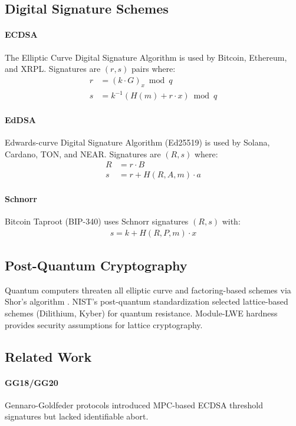 \documentclass[11pt,twocolumn]{article}
\begin{document}
\subsection{Digital Signature Schemes}

\paragraph{ECDSA} The Elliptic Curve Digital Signature Algorithm is used by Bitcoin, Ethereum, and XRPL. Signatures are $(r,s)$ pairs where:
\begin{align*}
r &= (k \cdot G)_x \bmod q \\
s &= k^{-1}(H(m) + r \cdot x) \bmod q
\end{align*}

\paragraph{EdDSA} Edwards-curve Digital Signature Algorithm (Ed25519) is used by Solana, Cardano, TON, and NEAR. Signatures are $(R, s)$ where:
\begin{align*}
R &= r \cdot B \\
s &= r + H(R, A, m) \cdot a
\end{align*}

\paragraph{Schnorr} Bitcoin Taproot (BIP-340) uses Schnorr signatures $(R, s)$ with:
\begin{align*}
s = k + H(R, P, m) \cdot x
\end{align*}

\subsection{Post-Quantum Cryptography}

Quantum computers threaten all elliptic curve and factoring-based schemes via Shor's algorithm \cite{shor1997}. NIST's post-quantum standardization selected lattice-based schemes (Dilithium, Kyber) for quantum resistance. Module-LWE hardness provides security assumptions for lattice cryptography.

\subsection{Related Work}

\paragraph{GG18/GG20} Gennaro-Goldfeder protocols \cite{gennaro2018,gennaro2020} introduced MPC-based ECDSA threshold signatures but lacked identifiable abort.
\end{document}
